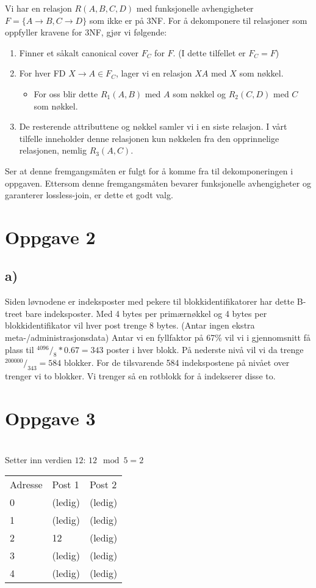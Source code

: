 \documentclass[a4paper, 12pt] {article}
\begin{document}
Vi har en relasjon $R(A,B,C,D)$ med funksjonelle avhengigheter $F = \{A \rightarrow B, C \rightarrow D\}$ som ikke er på 3NF. For å dekomponere til relasjoner som oppfyller kravene for 3NF, gjør vi følgende:

\begin{enumerate}
\item Finner et såkalt canonical cover $F_C$ for $F$. (I dette tilfellet er $F_C = F$)
\item For hver FD $X \rightarrow A \in F_C$, lager vi en relasjon $XA$ med $X$ som nøkkel.
    \begin{itemize}
    \item For oss blir dette $R_1(A,B)$ med $A$ som nøkkel og $R_2(C,D)$ med $C$ som nøkkel.
    \end{itemize}
\item De resterende attributtene og nøkkel samler vi i en siste relasjon. I vårt tilfelle inneholder denne relasjonen kun nøkkelen fra den opprinnelige relasjonen, nemlig $R_3(A,C)$.
\end{enumerate}

Ser at denne fremgangsmåten er fulgt for å komme fra til dekomponeringen i oppgaven. Ettersom denne fremgangsmåten bevarer funksjonelle avhengigheter og garanterer lossless-join, er dette et godt valg.

\section{Oppgave 2}
\subsection{a)}

Siden løvnodene er indeksposter med pekere til blokkidentifikatorer har dette B-treet bare indeksposter. Med 4 bytes per primærnøkkel og 4 bytes per blokkidentifikator vil hver post trenge 8 bytes. (Antar ingen ekstra meta-/administrasjonsdata) Antar vi en fyllfaktor på 67\% vil vi i gjennomsnitt få plass til $^{4096}/_{8} * 0.67 = 343$ poster i hver blokk. På nederste nivå vil vi da trenge $^{200000}/_{343} = 584$ blokker. For de tilsvarende 584 indekspostene på nivået over trenger vi to blokker. Vi trenger så en rotblokk for å indekserer disse to.


\newpage
\section{Oppgave 3}
~\\
Setter inn verdien $12$: $12 \mod 5 = 2$\\
\begin{tabular}{|l|l|l|}
    \hline
    Adresse & Post 1 & Post 2 \\
    0       & (ledig)& (ledig)\\
    1       & (ledig)& (ledig)\\
    2       & 12     & (ledig)\\
    3       & (ledig)& (ledig)\\
    4       & (ledig)& (ledig)\\ \hline
\end{tabular}
\end{document}
